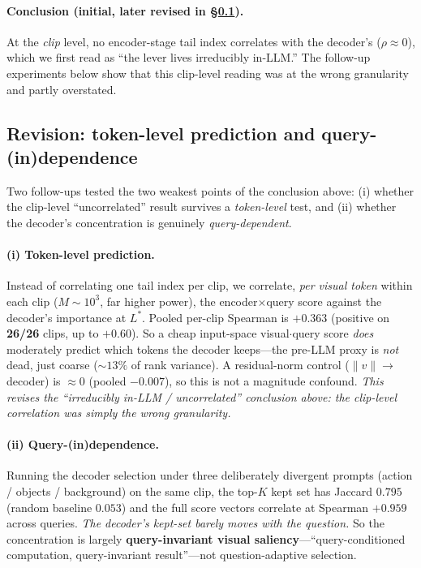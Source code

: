 \documentclass[11pt]{article}
\begin{document}
\paragraph{Conclusion (initial, later revised in \S\ref{sec:revision}).} At the
\emph{clip} level, no encoder-stage tail index correlates with the decoder's
($\rho\approx0$), which we first read as ``the lever lives irreducibly in-LLM.'' The
follow-up experiments below show that this clip-level reading was at the wrong
granularity and partly overstated.

\subsection{Revision: token-level prediction and query-(in)dependence}\label{sec:revision}
Two follow-ups tested the two weakest points of the conclusion above: (i) whether the
clip-level ``uncorrelated'' result survives a \emph{token-level} test, and (ii)
whether the decoder's concentration is genuinely \emph{query-dependent}.

\paragraph{(i) Token-level prediction.} Instead of correlating one tail index per
clip, we correlate, \emph{per visual token} within each clip ($M\sim10^3$, far higher
power), the encoder$\times$query score against the decoder's importance at $L^{\!*}$.
Pooled per-clip Spearman is $\mathbf{+0.363}$ (positive on \textbf{26/26} clips, up to
$+0.60$). So a cheap input-space visual$\cdot$query score \emph{does} moderately
predict which tokens the decoder keeps---the pre-LLM proxy is \emph{not} dead, just
coarse ($\sim13\%$ of rank variance). A residual-norm control ($\lVert v\rVert\to$
decoder) is $\approx0$ (pooled $-0.007$), so this is not a magnitude confound.
\emph{This revises the ``irreducibly in-LLM / uncorrelated'' conclusion above: the
clip-level correlation was simply the wrong granularity.}

\paragraph{(ii) Query-(in)dependence.} Running the decoder selection under three
deliberately divergent prompts (action / objects / background) on the same clip, the
top-$K$ kept set has Jaccard $\mathbf{0.795}$ (random baseline $0.053$) and the full
score vectors correlate at Spearman $\mathbf{+0.959}$ across queries. \emph{The
decoder's kept-set barely moves with the question.} So the concentration is largely
\textbf{query-invariant visual saliency}---``query-conditioned computation,
query-invariant result''---not question-adaptive selection.
\end{document}
